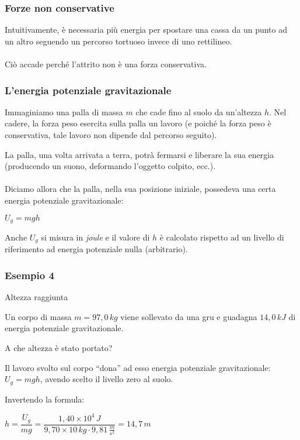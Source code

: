 \documentclass[]{beamer}
\theoremstyle{plain}
\begin{document}
\begin{frame}
  \frametitle{Forze non conservative}
  Intuitivamente, è necessaria più energia per spostare una cassa da un punto ad un altro seguendo un percorso tortuoso invece di uno rettilineo.\\\pause~\\Ciò accade perché \alert{l'attrito non è una forza conservativa}.
\end{frame}




\begin{frame}
  \frametitle{L'energia potenziale gravitazionale}
  Immaginiamo una palla di massa $ m $ che cade fino al suolo da un'altezza $ h $. Nel cadere, la forza peso esercita sulla palla un lavoro (e poiché la forza peso è conservativa, tale lavoro non dipende dal percorso seguito).\pause
  
  La palla, una volta arrivata a terra, potrà fermarsi e liberare la sua energia (producendo un suono, deformando l'oggetto colpito, ecc.).\\~\pause\\  
  Diciamo allora che la palla, nella sua posizione iniziale, possedeva una certa \alert{energia potenziale gravitazionale}:
  \begin{center}
\colorbox{blue!30}{$ U_g = mgh $}
\end{center}
Anche $ U_g $ si misura in \emph{joule} e il valore di $ h $ è calcolato rispetto ad un livello di riferimento ad energia potenziale nulla (arbitrario).
\end{frame}


\begin{frame}
  \frametitle{Esempio 4}
  \begin{exampleblock}{Altezza raggiunta}
{\small Un corpo di massa $ m=97,0 \, kg $ viene sollevato da una gru e guadagna $ 14,0 \, kJ $ di energia potenziale gravitazionale.

A che altezza è stato portato?}
\end{exampleblock}
  \pause
  Il lavoro svolto sul corpo ``dona'' ad  esso energia potenziale gravitazionale: $ U_g = mgh $, avendo scelto il livello zero al suolo.\pause
  
  Invertendo la formula:
  \begin{center}
  $ h = \dfrac{U_g}{mg} = \dfrac{1,40 \times 10^4 \, J}{9,70 \times 10 \, kg \cdot 9,81 \, \frac{m}{s^2}} = 14,7 \, m $
  \end{center}
\end{frame}
\end{document}
